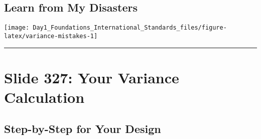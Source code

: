 \documentclass[
]{article}
\begin{document}
\subsection{Learn from My Disasters}\label{learn-from-my-disasters}

\texttt{[image: Day1\_Foundations\_International\_Standards\_files/figure-latex/variance-mistakes-1]}

\begin{center}\rule{0.5\linewidth}{0.5pt}\end{center}

\section{Slide 327: Your Variance
Calculation}\label{slide-327-your-variance-calculation}

\subsection{Step-by-Step for Your
Design}\label{step-by-step-for-your-design}
\end{document}

